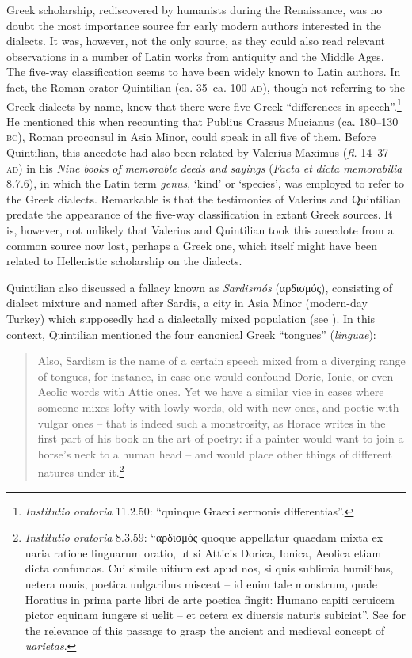 Greek scholarship, rediscovered by humanists during the Renaissance, was no doubt the most importance source for early modern authors interested in the dialects. It was, however, not the only source, as they could also read relevant observations in a number of Latin works from antiquity and the Middle Ages. The five-way classification seems to have been widely known to Latin authors. In fact, the Roman orator Quintilian (ca. 35–ca. 100 \textsc{ad}), though not referring to the Greek dialects by name, knew that there were five Greek “differences in speech”.\footnote{ \textrm{\textit{Institutio} \textit{oratoria}} \textrm{11.2.50: “quinque Graeci sermonis differentias”.}} He mentioned this when recounting that Publius Crassus Mucianus (ca. 180–130 \textsc{bc}), Roman proconsul in Asia Minor, could speak in all five of them. Before Quintilian, this anecdote had also been related by Valerius Maximus (\textit{fl.} 14–37 \textsc{ad}) in his \textit{Nine} \textit{books} \textit{of} \textit{memorable} \textit{deeds} \textit{and} \textit{sayings} (\textit{Facta} \textit{et} \textit{dicta} \textit{memorabilia} 8.7.6), in which the Latin term \textit{genus}, ‘kind’ or ‘species’, was employed to refer to the Greek dialects. Remarkable is that the testimonies of Valerius and Quintilian predate the appearance of the five-way classification in extant Greek sources. It is, however, not unlikely that Valerius and Quintilian took this anecdote from a common source now lost, perhaps a Greek one, which itself might have been related to Hellenistic scholarship on the dialects.

Quintilian also discussed a fallacy known as \textit{Sardismós} (\Sigma αρδισμός), consisting of dialect mixture and named after Sardis, a city in Asia Minor (modern-day Turkey) which supposedly had a dialectally mixed population (see \citealt{Gitner2019}). In this context, Quintilian mentioned the four canonical Greek “tongues” (\textit{linguae}):

\begin{quote}
Also, Sardism is the name of a certain speech mixed from a diverging range of tongues, for instance, in case one would confound Doric, Ionic, or even Aeolic words with Attic ones. Yet we have a similar vice in cases where someone mixes lofty with lowly words, old with new ones, and poetic with vulgar ones – that is indeed such a monstrosity, as Horace writes in the first part of his book on the art of poetry: if a painter would want to join a horse’s neck to a human head – and would place other things of different natures under it.\footnote{\textrm{ \textit{Institutio} \textit{oratoria}} \textrm{8.3.59: “\Sigma αρδισμός quoque appellatur quaedam mixta ex uaria ratione linguarum oratio, ut si Atticis Dorica, Ionica, Aeolica etiam dicta confundas. Cui simile uitium est apud nos, si quis sublimia humilibus, uetera nouis, poetica uulgaribus misceat – id enim tale monstrum, quale Horatius in prima parte libri de arte poetica fingit: Humano capiti ceruicem pictor equinam iungere si uelit – et cetera ex diuersis naturis subiciat”. See \citet[46]{Carruthers2009} for the relevance of this passage to grasp the ancient and medieval concept of} \textrm{\textit{uarietas}}.}
\end{quote}

